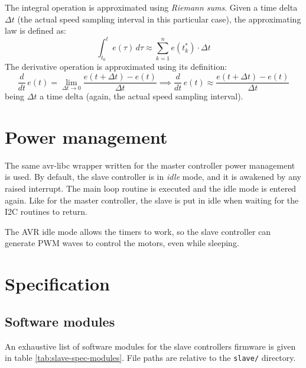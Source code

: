 The integral operation is approximated using \emph{Riemann sums}. Given a time
delta $\Delta t$ (the actual speed sampling interval in this particular case),
the approximating law is defined as:
\begin{equation}
  \int_{t_0}^t e(\tau)\,d\tau \approx \sum_{k=1}^n e(t_k^*) \cdot \Delta t
\end{equation}
The derivative operation is approximated using its
definition\cite{levy-num-analysis}:
\begin{equation}
  \frac{d}{dt}\,e(t) = \lim_{\Delta t \to 0} \frac{e(t + \Delta t) - e(t)}{\Delta t} \implies
  \frac{d}{dt}\,e(t) \approx \frac{e(t + \Delta t) - e(t)}{\Delta t}
\end{equation}
being $\Delta t$ a time delta (again, the actual speed sampling interval).

\section{Power management}
The same avr-libc wrapper written for the master controller power management is
used.
By default, the slave controller is in \emph{idle} mode, and it is awakened by
any raised interrupt. The main loop routine is executed and the idle mode is
entered again. Like for the master controller, the slave is put in idle when
waiting for the I2C routines to return.

The AVR idle mode allows the timers to work, so the slave controller can
generate PWM waves to control the motors, even while sleeping.

\section{Specification}

\subsection{Software modules}
An exhaustive list of software modules for the slave controllers firmware is
given in table \ref{tab:slave-spec-modules}. File paths are relative to the
\texttt{slave/} directory.

